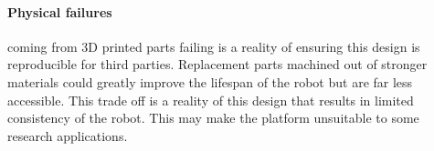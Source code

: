 \paragraph{Physical failures} coming from 3D printed parts failing is a reality of ensuring this design is reproducible for third parties. Replacement parts machined out of stronger materials could greatly improve the lifespan of the robot but are far less accessible. This trade off is a reality of this design that results in limited consistency of the robot. This may make the platform unsuitable to some research applications. 